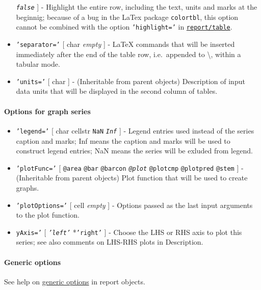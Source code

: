 \begin{itemize}
  \emph{\texttt{false}} {]} - Highlight the entire row, including the
  text, units and marks at the beginnig; because of a bug in the LaTex
  package \texttt{colortbl}, this option cannot be combined with the
  option \texttt{'highlight='} in
  \href{report/table}{\texttt{report/table}}.
\item
  \texttt{'separator='} {[} char \textbar{} \emph{empty} {]} - LaTeX
  commands that will be inserted immediately after the end of the table
  row, i.e.~appended to \textbackslash{}, within a tabular mode.
\item
  \texttt{'units='} {[} char {]} - (Inheritable from parent objects)
  Description of input data units that will be displayed in the second
  column of tables.
\end{itemize}

\paragraph{Options for graph series}

\begin{itemize}
\item
  \texttt{'legend='} {[} char \textbar{} cellstr \textbar{} \texttt{NaN}
  \textbar{} \emph{\texttt{Inf}} {]} - Legend entries used instead of
  the series caption and marks; Inf means the caption and marks will be
  used to construct legend entries; NaN means the series will be exluded
  from legend.
\item
  \texttt{'plotFunc='} {[} \texttt{@area} \textbar{} \texttt{@bar}
  \textbar{} \texttt{@barcon} \textbar{} \emph{\texttt{@plot}}
  \textbar{} \texttt{@plotcmp} \textbar{} \texttt{@plotpred} \textbar{}
  \texttt{@stem} {]} - (Inheritable from parent objects) Plot function
  that will be used to create graphs.
\item
  \texttt{'plotOptions='} {[} cell \textbar{} \emph{empty} {]} - Options
  passed as the last input arguments to the plot function.
\item
  \texttt{yAxis='} {[} \emph{\texttt{'left'}} \textbar{}
  *\texttt{'right'} {]} - Choose the LHS or RHS axis to plot this
  series; see also comments on LHS-RHS plots in Description.
\end{itemize}

\paragraph{Generic options}

See help on \href{report/Contents}{generic options} in report objects.

